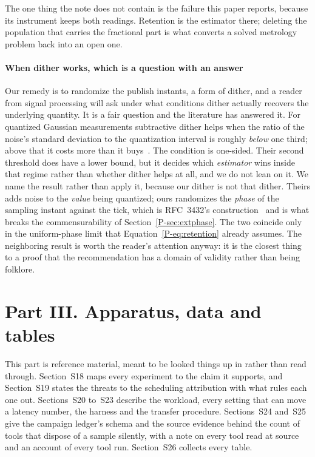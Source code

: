 \documentclass[10pt,journal,onecolumn]{IEEEtran}
\newcommand{\mainPhase}{\ref{P-sec:extphase}}            %
\begin{document}
The one thing the note does not contain is the failure this paper reports, because its
instrument keeps both readings. Retention is the estimator there; deleting the population
that carries the fractional part is what converts a solved metrology problem back into an
open one.

\paragraph{When dither works, which is a question with an answer}
Our remedy is to randomize the publish instants, a form of dither, and a reader from signal
processing will ask under what conditions dither actually recovers the underlying quantity. It is a fair question and
the literature has answered it. For quantized Gaussian measurements subtractive dither helps
when the ratio of the noise's standard deviation to the quantization interval is roughly
\emph{below} one third; above that it costs more than it buys~\cite{rapp2019dither}. The
condition is one-sided. Their second threshold does have a lower bound, but it decides which
\emph{estimator} wins inside that regime rather than whether dither helps at all, and we do
not lean on it. We name the result rather than
apply it, because our dither is not that dither. Theirs adds noise to the \emph{value} being
quantized; ours randomizes the \emph{phase} of the sampling instant against the tick, which
is RFC~3432's construction~\cite{rfc3432} and is what breaks the commensurability of
Section~\mainPhase{}. The two coincide only in the uniform-phase limit that
Equation~\ref{P-eq:retention} already assumes. The neighboring result is worth the reader's
attention anyway: it is the closest thing to a proof that the recommendation has a domain of
validity rather than being folklore.

\section*{Part III. Apparatus, data and tables}

This part is reference material, meant to be looked things up in rather than read through. Section~S18 maps every experiment to the claim it supports, and Section~S19 states the threats to the scheduling attribution with what rules each one out. Sections~S20 to~S23 describe the workload, every setting that can move a latency number, the harness and the transfer procedure. Sections~S24 and~S25 give the campaign ledger's schema and the source evidence behind the count of tools that dispose of a sample silently, with a note on every tool read at source and an account of every tool run. Section~S26 collects every table.
\end{document}
